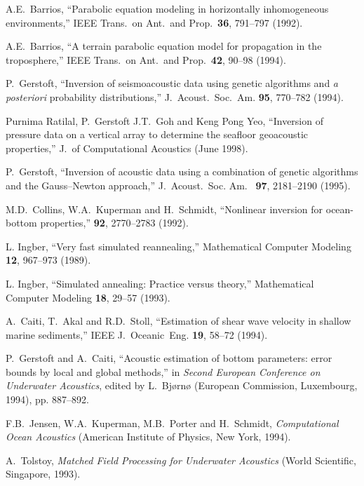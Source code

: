 \documentclass{saclantc}
\begin{document}
\begin{thebibliography}{11}
 A.E.\ Barrios, ``Parabolic equation modeling in horizontally
inhomogeneous environments,'' 
IEEE Trans.\ on Ant.\ and Prop.\ {\bf 36}, 791--797 (1992).

 A.E.\ Barrios, ``A terrain parabolic equation model for propagation in the
   troposphere,'' IEEE Trans.\ on Ant.\ and Prop.\ {\bf 42}, 90--98
(1994).

P.~Gerstoft, ``Inversion of seismoacoustic data using genetic algorithms and
{\it a posteriori} probability distributions,''
{ J.~Acoust.~Soc.~Am.} {\bf 95}, 770--782 (1994).


 Purnima Ratilal, P.\ Gerstoft J.T.\ Goh and Keng Pong Yeo, ``Inversion
of pressure data on a vertical array to determine the seafloor
geoacoustic properties,'' {J.\ of Computational
Acoustics} (June 1998). %

P.~Gerstoft, ``Inversion of acoustic data using a combination of 
genetic algorithms 
and the Gauss--Newton approach,'' {J.\ Acoust.\ Soc. Am.\ } {\bf 97},
2181--2190 (1995).


M.D.\ Collins, W.A.\ Kuperman and H.~Schmidt,
\newblock ``Nonlinear inversion for ocean-bottom properties,''
 {\bf 92}, 2770--2783 (1992).


L. Ingber, ``Very fast simulated reannealing,'' {Mathematical Computer
Modeling} {\bf 12}, 967--973 (1989).

L. Ingber, ``Simulated annealing: Practice versus theory,''
{Mathematical Computer Modeling} {\bf 18}, 29--57 (1993).

A.~Caiti, T.~Akal and R.D.~Stoll, ``Estimation of shear wave velocity
in shallow marine sediments,''
IEEE J.~Oceanic~Eng. {\bf 19}, 58--72  (1994).

 P.~Gerstoft and  A.~Caiti, ``Acoustic estimation of bottom parameters:
error bounds by local and global methods,'' in 
{\it Second European
Conference on Underwater Acoustics}, edited by L.~Bj{\o}rn{\o}
(European Commission, Luxembourg, 1994), pp. 887--892.

  F.B.\ Jensen, W.A.\ Kuperman, M.B.\ Porter and H.\
Schmidt, {\it Computational Ocean Acoustics}
(American Institute of Physics, New York, 1994).

  A.\ Tolstoy, {\it Matched Field Processing for Underwater
Acoustics} (World Scientific, Singapore, 1993).


\end{thebibliography}
\end{document}
